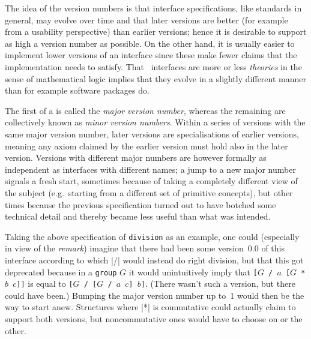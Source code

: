 \documentclass{mtmtcl}
\theoremstyle{plain}
\theoremstyle{remark}
\begin{document}
The idea of the version numbers is that interface specifications, like 
standards in general, may evolve over time and that later versions 
are better (for example from a usability perspective) than earlier 
versions; hence it is desirable to support as high a version number 
as possible. On the other hand, it is usually easier to implement 
lower versions of an interface since these make fewer claims that the 
implementation needs to satisfy. That \mtl\ interfaces are more or less 
\emph{theories} in the sense of mathematical logic implies that they 
evolve in a slightly different manner than for example software 
packages do.

The first  of a  is called the 
\emph{major version number}, whereas the remaining are collectively 
known as \emph{minor version numbers}. Within a series of versions 
with the same major version number, later versions are 
specialisations of earlier versions, meaning any axiom claimed by the 
earlier version must hold also in the later version. Versions with 
different major numbers are however formally as independent as 
interfaces with different names; a jump to a new major number signals 
a fresh start, sometimes because of taking a completely different 
view of the subject (e.g.~starting from a different set of primitive 
concepts), but other times because the previous specification turned 
out to have botched some technical detail and thereby became less 
useful than what was intended.

Taking the above specification of \texttt{division} as an example, 
one could (especially in view of the \emph{remark}) imagine that there 
had been some version~0.0 of this interface according to which |/| 
would instead do right division, but that this got deprecated because 
in a \texttt{group} $G$ it would unintuitively imply that 
\texttt{[$G$ / $a$ [$G$ * $b$ $c$]]} is equal to 
\texttt{[$G$ / [$G$ / $a$ $c$] $b$]}. (There wasn't such a version, 
but there could have been.) Bumping the major version number up to~1 
would then be the way to start anew. Structures where |*| is 
commutative could actually claim to support both versions, but 
noncommutative ones would have to choose on or the other.
\end{document}

